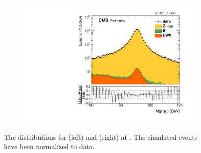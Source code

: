 \begin{figure}
\begin{subfigure}{.50\textwidth}
\end{subfigure}%
\centering
\begin{subfigure}{.50\textwidth}
\centering
\includegraphics[width=\linewidth]{plots/Z/5tev/zmmlog.pdf}
\end{subfigure}%
\caption{The \mll distributions for \zee (left) and \zmm (right) at \sg. The simulated events have been normalized to data.}
\label{fig:z:z:5}
\end{figure}